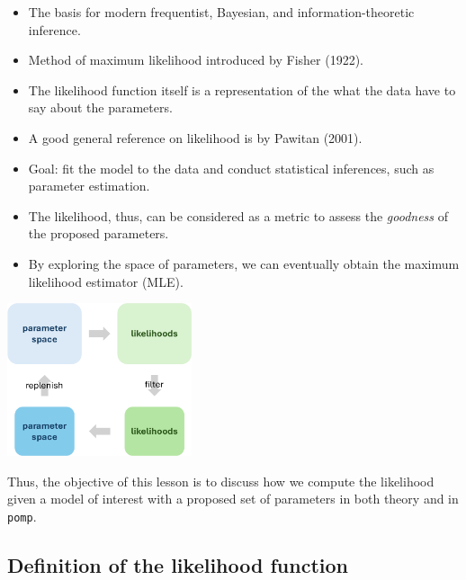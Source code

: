 \documentclass[
  letterpaper,
  DIV=11,
  numbers=noendperiod]{scrartcl}
\providecommand{\tightlist}{%
  \setlength{\itemsep}{0pt}\setlength{\parskip}{0pt}}\usepackage{longtable,booktabs,array}
\begin{document}
\begin{itemize}
\tightlist
\item
  The basis for modern frequentist, Bayesian, and information-theoretic
  inference.
\item
  Method of maximum likelihood introduced by Fisher (1922).
\item
  The likelihood function itself is a representation of the what the
  data have to say about the parameters.
\item
  A good general reference on likelihood is by Pawitan (2001).
\end{itemize}

\framebreak

\begin{itemize}
\tightlist
\item
  Goal: fit the model to the data and conduct statistical inferences,
  such as parameter estimation.
\item
  The likelihood, thus, can be considered as a metric to assess the
  \emph{goodness} of the proposed parameters.
\item
  By exploring the space of parameters, we can eventually obtain the
  maximum likelihood estimator (MLE).
\end{itemize}

\begin{center}
  \includegraphics[height=4.5cm]{../graphics/lec3_procedure}
\end{center}

\vfill

Thus, the objective of this lesson is to discuss how we compute the
likelihood given a model of interest with a proposed set of parameters
in both theory and in \texttt{pomp}.

\hypertarget{definition-of-the-likelihood-function}{%
\subsection{Definition of the likelihood
function}\label{definition-of-the-likelihood-function}}
\end{document}
